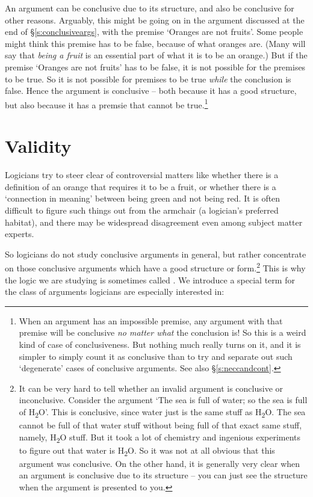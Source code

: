  An argument can be conclusive due to its structure, and also be conclusive for other reasons. Arguably, this might be going on in the argument discussed at the end of §\ref{s:conclusiveargs}, with the premise `Oranges are not fruits'. Some people might think this premise has to be false, because of what oranges are. (Many will say that \emph{being a fruit} is an essential part of what it is to be an orange.) But if the premise `Oranges are not fruits' has to be false, it is not possible for the premises to be true. So it is not possible for premises to be true \emph{while} the conclusion is false. Hence the argument is conclusive – both because it has a good structure, but also because it has a premsie that cannot be true.\footnote{When an argument has an impossible premise, any argument with that premise will be conclusive \emph{no matter what} the conclusion is! So this is a weird kind of case of conclusiveness. But nothing much really turns on it, and it is simpler to simply count it as conclusive than to try and separate out such `degenerate' cases of conclusive arguments. See also §\ref{s:neccandcont}.}


\section{Validity}\label{s:validityintro}

Logicians try to steer clear of controversial matters like whether there is a definition of an orange that requires it to be a fruit, or whether there is a `connection in meaning' between being green and not being red. It is often difficult to figure such things out from the armchair (a logician's preferred habitat), and there may be widespread disagreement even among subject matter experts.

So logicians do not study conclusive arguments in general, but rather concentrate on those conclusive arguments which have a good structure or form.\footnote{It can be very hard to tell whether an invalid argument is conclusive or inconclusive. Consider the argument `The sea is full of water; so the sea is full of H\textsubscript{2}O'. This is conclusive, since water just is the same stuff as H\textsubscript{2}O. The sea cannot be full of that water stuff without being full of that exact same stuff, namely, H\textsubscript{2}O stuff. But it took a lot of chemistry and ingenious experiments to figure out that water is H\textsubscript{2}O. So it was not at all obvious that this argument was conclusive. On the other hand, it is generally very clear when an argument is conclusive due to its structure – you can just see the structure when the argument is presented to you.} This is why the logic we are studying is sometimes called . We introduce a special term for the class of arguments logicians are especially interested in:

